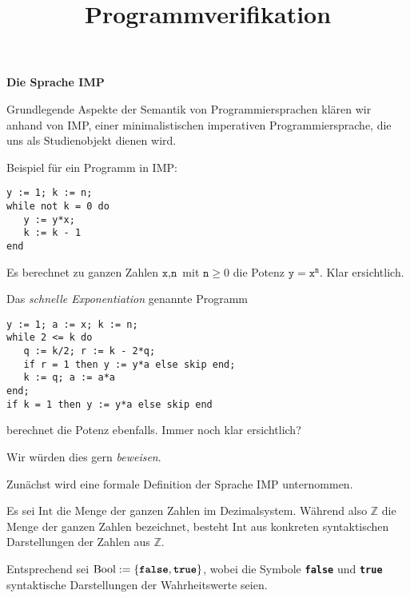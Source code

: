 \documentclass[8pt,fleqn,aspectratio=169]{beamer}
\title{Programmverifikation}
\date{}
\newcommand{\strong}[1]{\textsf{\textbf{#1}}}
\newcommand{\centerheadline}[1]{%
  \begin{center}\strong{#1}\end{center}}
\newcommand{\parspace}{\vspace{0.8em}}
\newcommand{\kw}[1]{\textbf{\texttt{#1}}}
\newcommand{\code}[1]{{\texttt{#1}}}
\newcommand{\Bool}{\mathrm{Bool}}
\newcommand{\Int}{\mathrm{Int}}
\newcommand{\Z}{\mathbb Z}
\begin{document}
\begin{frame}
\maketitle
\end{frame}

\begin{frame}
\centerheadline{Die Sprache IMP}
\end{frame}

\begin{frame}
Grundlegende Aspekte der Semantik von Programmiersprachen klären wir
anhand von IMP, einer minimalistischen imperativen Programmiersprache,
die uns als Studienobjekt dienen wird.
\end{frame}

\begin{frame}[fragile]

Beispiel für ein Programm in IMP:
\begin{lstlisting}[language=IMP, xleftmargin=\mathindent]
y := 1; k := n;
while not k = 0 do
   y := y*x;
   k := k - 1
end
\end{lstlisting}\pause
Es berechnet zu ganzen Zahlen $\code{x},\code{n}$ mit $\code{n}\ge 0$
die Potenz $\code{y} = \code{x}^\code{n}$. Klar ersichtlich.\pause

\parspace
Das \emph{schnelle Exponentiation} genannte Programm
\begin{lstlisting}[language=IMP, xleftmargin=\mathindent]
y := 1; a := x; k := n;
while 2 <= k do
   q := k/2; r := k - 2*q;
   if r = 1 then y := y*a else skip end;
   k := q; a := a*a
end;
if k = 1 then y := y*a else skip end
\end{lstlisting}
berechnet die Potenz ebenfalls. Immer noch klar ersichtlich?

\parspace
Wir würden dies gern \emph{beweisen}.
\end{frame}

\begin{frame}
Zunächst wird eine formale Definition der Sprache IMP unternommen.\pause

\parspace
Es sei $\Int$ die Menge der ganzen Zahlen im Dezimalsystem. Während also
$\Z$ die Menge der ganzen Zahlen bezeichnet, besteht $\Int$ aus konkreten
syntaktischen Darstellungen der Zahlen aus $\Z$.\pause

\parspace
Entsprechend sei $\Bool:=\{\kw{false},\kw{true}\}$, wobei die
Symbole \kw{false} und \kw{true} syntaktische Darstellungen der
Wahrheitswerte seien.
\end{frame}
\end{document}
